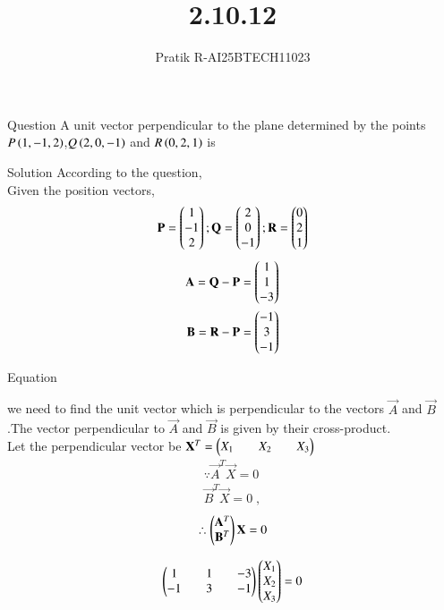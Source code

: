 \documentclass{beamer}
\title %
{2.10.12}
\author %
{Pratik R-AI25BTECH11023}
\begin{document}
\frame{\titlepage}
\begin{frame}{Question}
A unit vector perpendicular to the plane determined by the points
$P\left(1,-1,2\right)$,$Q\left(2,0,-1\right)$ and $R\left(0,2,1\right)$ is 

\end{frame}



\begin{frame}{Solution}
According to the question, \\
Given the position vectors,
\begin{align}
    \mathbf{P}=\begin{pmatrix}1\\-1\\2\end{pmatrix};
    \mathbf{Q}=\begin{pmatrix}2\\0\\-1\end{pmatrix};
    \mathbf{R}=\begin{pmatrix}0\\2\\1\end{pmatrix}
\end{align}
\begin{align}
    \mathbf{A}= \mathbf{Q}-\mathbf{P} = \begin{pmatrix}1\\1\\-3\end{pmatrix}\\
    \mathbf B = \mathbf{R}-\mathbf{P} = \begin{pmatrix}-1\\3\\-1\end{pmatrix}
\end{align}

\end{frame}

\begin{frame}{Equation}

we need to find the unit vector which is perpendicular to the vectors $\vec{A}$ and $\vec{B}$.The vector perpendicular to $\vec{A}$ and $\vec{B}$ is given by their cross-product.\\
Let the perpendicular vector be $\mathbf{X}^T=\begin{pmatrix}X_1&&X_2&&X_3\end{pmatrix}$
\begin{align}
    \because \vec{A}^T\vec{X}=0\\
    \vec{B}^T\vec{X}=0\;,
\end{align}
\begin{align}
    \therefore \begin{pmatrix}\mathbf{A}^T\\\mathbf{B}^T\end{pmatrix}\mathbf{X}=0
\end{align}

\begin{align}
    \begin{pmatrix}1&&1&&-3\\-1&&3&&-1\end{pmatrix}\begin{pmatrix}X_1\\X_2\\X_3\end{pmatrix}=0
\end{align}
\end{frame}
\end{document}
